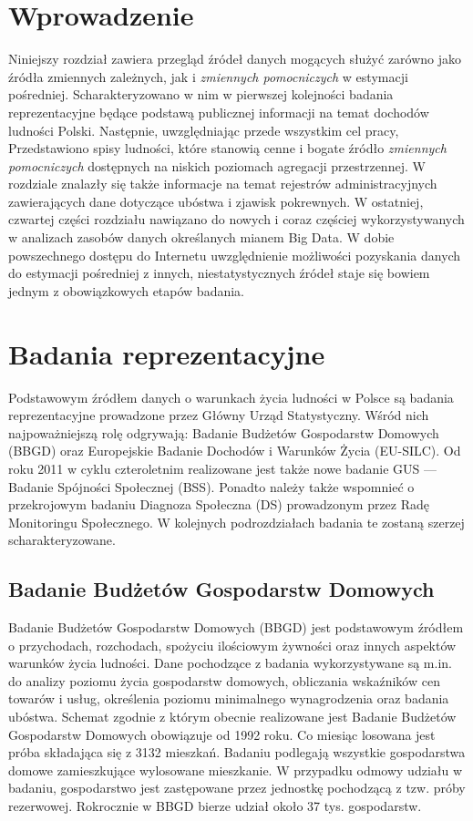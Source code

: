 \section{Wprowadzenie}

Niniejszy rozdział zawiera przegląd źródeł danych mogących służyć zarówno jako źródła zmiennych zależnych, jak i \textit{zmiennych pomocniczych} w estymacji pośredniej. Scharakteryzowano w nim w pierwszej kolejności badania reprezentacyjne będące podstawą publicznej informacji na temat dochodów ludności Polski. Następnie, uwzględniając przede wszystkim cel pracy, Przedstawiono spisy ludności, które stanowią cenne i bogate źródło \textit{zmiennych pomocniczych} dostępnych na niskich poziomach agregacji przestrzennej. W rozdziale znalazły się także informacje na temat rejestrów administracyjnych zawierających dane dotyczące ubóstwa i zjawisk pokrewnych. W ostatniej, czwartej części rozdziału nawiązano do nowych i coraz częściej wykorzystywanych w analizach zasobów danych określanych mianem Big Data. W dobie powszechnego dostępu do Internetu uwzględnienie możliwości pozyskania danych do estymacji pośredniej z innych, niestatystycznych źródeł staje się bowiem jednym z obowiązkowych etapów badania.

\section{Badania reprezentacyjne}

Podstawowym źródłem danych o warunkach życia ludności w Polsce są badania reprezentacyjne prowadzone przez Główny Urząd Statystyczny. Wśród nich najpoważniejszą rolę odgrywają: Badanie Budżetów Gospodarstw Domowych (BBGD) oraz Europejskie Badanie Dochodów i Warunków Życia (EU-SILC). Od roku 2011 w cyklu czteroletnim realizowane jest także nowe badanie GUS --- Badanie Spójności Społecznej (BSS). Ponadto należy także wspomnieć o przekrojowym badaniu Diagnoza Społeczna (DS) prowadzonym przez Radę Monitoringu Społecznego. W kolejnych podrozdziałach badania te zostaną szerzej scharakteryzowane.

\subsection{Badanie Budżetów Gospodarstw Domowych}

Badanie Budżetów Gospodarstw Domowych (BBGD) jest podstawowym źródłem o przychodach, rozchodach, spożyciu ilościowym żywności oraz innych aspektów warunków życia ludności. Dane pochodzące z badania wykorzystywane są m.in. do analizy poziomu życia gospodarstw domowych, obliczania wskaźników cen towarów i usług, określenia poziomu minimalnego wynagrodzenia oraz badania ubóstwa. Schemat zgodnie z którym obecnie realizowane jest Badanie Budżetów Gospodarstw Domowych obowiązuje od 1992 roku. Co miesiąc losowana jest próba składająca się z 3132 mieszkań. Badaniu podlegają wszystkie gospodarstwa domowe zamieszkujące wylosowane mieszkanie. W przypadku odmowy udziału w badaniu, gospodarstwo jest zastępowane przez jednostkę pochodzącą z tzw. próby rezerwowej. Rokrocznie w BBGD bierze udział około 37 tys. gospodarstw.

